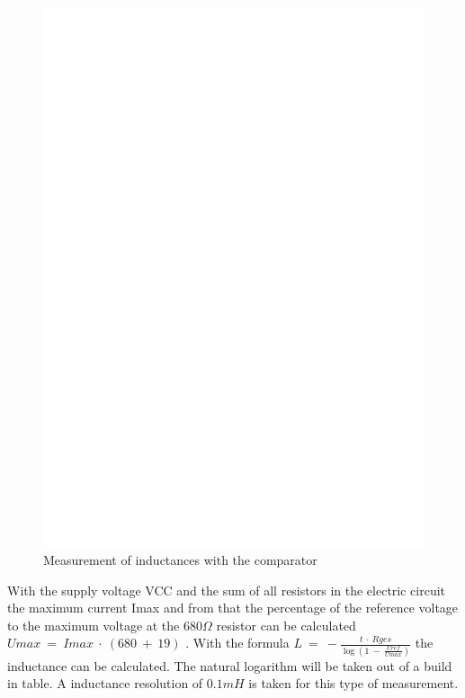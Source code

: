 \begin{figure}[H]
\centering
\includegraphics[]{../FIG/Inductance.eps}
\caption{Measurement of inductances with the comparator}
\label{fig:Inductance}
\end{figure}

With the supply voltage VCC and the sum of all resistors in the electric circuit the maximum current Imax and from
that the percentage of the reference voltage to the maximum voltage at the \(680\Omega\) resistor can be calculated
\(Umax~=~Imax~\cdot~(680~+~19)\) .
With the formula \(L~=~-\frac{t~\cdot~Rges}{\log{(1~-~\frac{Uref}{Umax})}}\) the inductance can be calculated.
The natural logarithm will be taken out of a build in table.
A inductance resolution of \(0.1mH\) is taken for this type of measurement.


